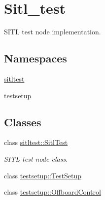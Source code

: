 \hypertarget{group__sitl__test}{}\section{Sitl\+\_\+test}
\label{group__sitl__test}


S\+I\+TL test node implementation.  


\subsection*{Namespaces}
\begin{DoxyCompactItemize}
\item 
 \mbox{\hyperlink{namespacesitltest}{sitltest}}
\item 
 \mbox{\hyperlink{namespacetestsetup}{testsetup}}
\end{DoxyCompactItemize}
\subsection*{Classes}
\begin{DoxyCompactItemize}
\item 
class \mbox{\hyperlink{classsitltest_1_1SitlTest}{sitltest\+::\+Sitl\+Test}}
\begin{DoxyCompactList}\small\item\em S\+I\+TL test node class. \end{DoxyCompactList}\item 
class \mbox{\hyperlink{classtestsetup_1_1TestSetup}{testsetup\+::\+Test\+Setup}}
\item 
class \mbox{\hyperlink{classtestsetup_1_1OffboardControl}{testsetup\+::\+Offboard\+Control}}
\end{DoxyCompactItemize}
